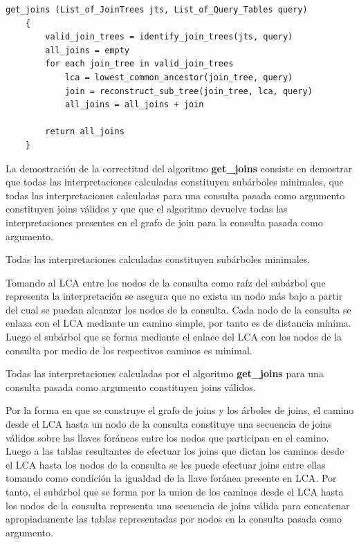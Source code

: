 \begin{lstlisting}[label={querytime}, caption={Pseudoc\'odigo del algoritmo de inferencia de joins}]
    get_joins (List_of_JoinTrees jts, List_of_Query_Tables query)
    {
        valid_join_trees = identify_join_trees(jts, query)
        all_joins = empty
        for each join_tree in valid_join_trees
            lca = lowest_common_ancestor(join_tree, query)
            join = reconstruct_sub_tree(join_tree, lca, query)
            all_joins = all_joins + join

        return all_joins
    }
\end{lstlisting}

La demostración de la correctitud del algoritmo \textbf{get\_joins} consiste en demostrar 
que todas las interpretaciones calculadas constituyen sub\'arboles minimales, que todas las interpretaciones calculadas
para una consulta pasada como argumento constituyen 
joins v\'alidos y que que el algoritmo devuelve todas las interpretaciones presentes en el grafo de join 
para la consulta pasada como argumento.

\begin{theorem}
    Todas las interpretaciones calculadas constituyen subárboles minimales.
\end{theorem}

Tomando al LCA entre los nodos de la consulta como raíz del subárbol que representa la interpretaci\'on 
se asegura que no exista un nodo m\'as bajo a partir del cual se puedan alcanzar los nodos de la consulta. 
Cada nodo de la consulta se enlaza con el LCA mediante un camino simple, por tanto es de distancia m\'inima. 
Luego el subárbol que se forma mediante el enlace del LCA con los nodos de la consulta por medio de los respectivos 
caminos es minimal.

\begin{theorem}
    Todas las interpretaciones calculadas por el algoritmo \textbf{get\_joins} para una consulta pasada como 
    argumento constituyen joins v\'alidos.
\end{theorem}

Por la forma en que se construye el grafo de joins y los \'arboles de joins, el camino desde el 
LCA hasta un nodo de la consulta constituye una secuencia de joins v\'alidos sobre las llaves for\'aneas entre los 
nodos que participan en el camino. Luego a las tablas resultantes de efectuar los joins que dictan los caminos 
desde el LCA hasta los nodos de la consulta se les puede efectuar joins entre ellas tomando como condici\'on 
la igualdad de la llave for\'anea presente en LCA. Por tanto, el sub\'arbol que se forma por la union de los 
caminos desde el LCA hasta los nodos de la consulta representa una secuencia de joins v\'alida para concatenar 
apropiadamente las tablas representadas por nodos en la consulta pasada como argumento. 


